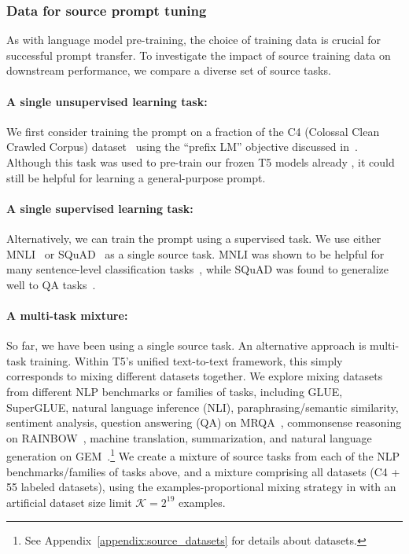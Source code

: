 \subsubsection{Data for source prompt tuning} As with language model pre-training, the choice of training data is crucial for successful prompt transfer. To investigate the impact of source training data on downstream performance, we compare a diverse set of source tasks. 

\paragraph{A single unsupervised learning task:} We first consider training the prompt on a fraction of the {\small \sc C4} (Colossal Clean Crawled Corpus) dataset~\cite{CRaffel20} using the ``prefix LM'' objective discussed in~\citet{CRaffel20}. Although this task was used to pre-train our frozen {\small \sc T5} models already , it could still be helpful for learning a general-purpose prompt.

\paragraph{A single supervised learning task:} Alternatively, we can train the prompt using a supervised task. We use either {\small \sc MNLI}~\cite{AWilliams18} or {\small \sc SQuAD}~\cite{PRajpurkar16} as a single source task. {\small \sc MNLI} was shown to be helpful for many sentence-level classification tasks~\cite{JPhang19}, while {\small \sc SQuAD} was found to generalize well to {\small \sc QA} tasks~\cite{ATalmor19}.
\paragraph{A multi-task mixture:} So far, we have been using a single source task. An alternative approach is multi-task training. Within {\small \sc T5}'s unified text-to-text framework, this simply corresponds to mixing different datasets together. We explore mixing datasets from different {\small \sc NLP} benchmarks or families of tasks, including {\small \sc GLUE}, {\small \sc SuperGLUE}, natural language inference ({\small \sc NLI}), paraphrasing/semantic similarity, sentiment analysis, question answering ({\small \sc QA}) on {\small \sc MRQA}~\cite{AFisch19}, commonsense reasoning on {\small \sc RAINBOW}~\cite{NLourie21}, machine translation, summarization, and natural language generation on {\small \sc GEM}~\cite{SGehrmann21}.\footnote{See Appendix~\ref{appendix:source_datasets} for details about datasets.} We create a mixture of source tasks from each of the {\small \sc NLP} benchmarks/families of tasks above, and a mixture comprising all datasets (C4 + 55 labeled datasets), using the examples-proportional mixing strategy in \citet{CRaffel20} with an artificial dataset size limit $\bm{\mathcal{K}}=2^{19}$ examples. 

